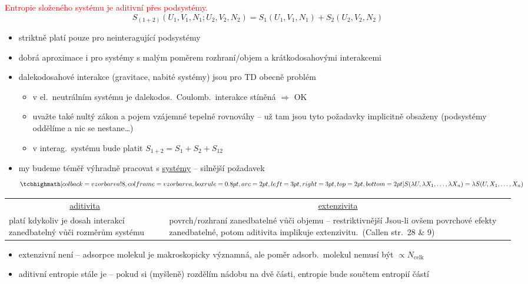 \begin{veta}[Postulát 4]
\textcolor{Red}{Entropie složeného systému je aditivní přes podsystémy.}
\[ S_{(1+2)}(U_1,V_1,N_1;U_2,V_2,N_2) = S_1(U_1,V_1,N_1) + S_2(U_2,V_2,N_2) \]
\end{veta}
\begin{itemize}
  \item[$\to$] striktně platí pouze pro neinteragující podsystémy
  \item[$\to$] dobrá aproximace i pro systémy s malým poměrem rozhraní/objem a krátkodosahovými interakcemi
  \item[$\to$] dalekodosahové interakce (gravitace, nabité systémy) jsou pro TD obecně problém
  \begin{itemize}
    \item[$\to$] v el.\ neutrálním systému je dalekodos.\ Coulomb.\ interakce stíněná $\Rightarrow$ OK
    \item[$\to$] uvažte také nultý zákon a pojem vzájemné tepelné rovnováhy -- už tam jsou tyto požadavky implicitně obsaženy (podsystémy oddělíme a nic se nestane\dots)
    \item[$\to$] v interag.\ systému bude platit $S_{1+2} = S_1 + S_2 + S_{12}$
  \end{itemize}
  \item[$\to$] my budeme téměř výhradně pracovat s \underline{ systémy} -- silnější požadavek
  \[ \vzorec{S(\lambda U,\lambda X_1,\dots,\lambda X_n) = \lambda S(U,X_1,\dots,X_n)} \]
\end{itemize}

\begin{center}
\begin{tabular}{p{}@{\qquad}p{}}
\multicolumn{1}{c}{\underline{aditivita}} & \multicolumn{1}{c}{\underline{extenzivita}} \\[3pt]
platí kdykoliv je dosah interakcí zanedbatelný vůči rozměrům systému &
povrch/rozhraní zanedbatelné vůči objemu -- restriktivnější \newline
\textcolor{NavyBlue}{Jsou-li ovšem povrchové efekty zanedbatelné, potom aditivita implikuje extenzivitu.\ (Callen str.\ 28 \& 9)}
\end{tabular}
\end{center}
\begin{priklad}
\begin{itemize}[nosep]
  \item[$\to$] extenzivní není -- adsorpce molekul je makroskopicky významná, ale poměr adsorb.\ molekul nemusí být $\propto N_{\text{celk}}$
  \item[$\to$] aditivní entropie stále je -- pokud si (myšleně) rozdělím nádobu na dvě části, entropie bude součtem entropií částí
\end{itemize}
\end{priklad}

